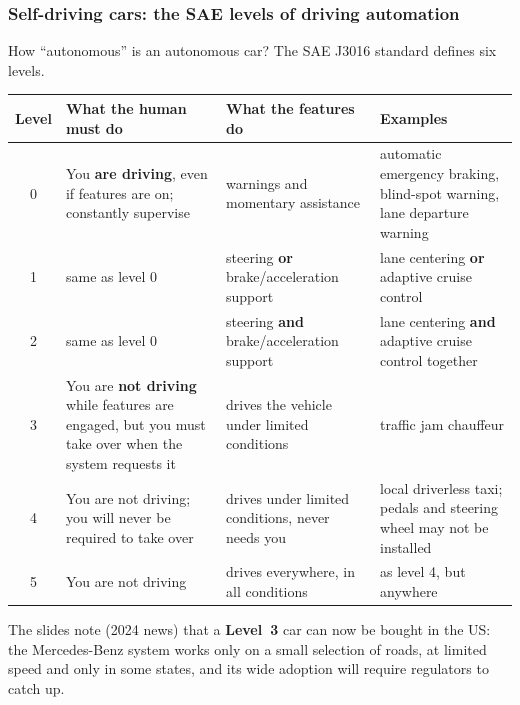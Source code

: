 \subsubsection{Self-driving cars: the SAE levels of driving automation}

How ``autonomous'' is an autonomous car? The SAE J3016 standard defines six levels.

\begin{center}
\small
\renewcommand{\arraystretch}{1.15}
\begin{tabularx}{\linewidth}{@{}c >{\raggedright\arraybackslash}X >{\raggedright\arraybackslash}X >{\raggedright\arraybackslash}X@{}}
\toprule
\textbf{Level} & \textbf{What the human must do} & \textbf{What the features do} & \textbf{Examples} \\
\midrule
\rowcolor{nbblue!6} 0 & You \textbf{are driving}, even if features are on; constantly supervise & warnings and momentary assistance & automatic emergency braking, blind-spot warning, lane departure warning \\
\rowcolor{nbblue!6} 1 & same as level 0 & steering \textbf{or} brake/acceleration support & lane centering \textbf{or} adaptive cruise control \\
\rowcolor{nbblue!6} 2 & same as level 0 & steering \textbf{and} brake/acceleration support & lane centering \textbf{and} adaptive cruise control together \\
\rowcolor{nbgreen!8} 3 & You are \textbf{not driving} while features are engaged, but you must take over when the system requests it & drives the vehicle under limited conditions & traffic jam chauffeur \\
\rowcolor{nbgreen!8} 4 & You are not driving; you will never be required to take over & drives under limited conditions, never needs you & local driverless taxi; pedals and steering wheel may not be installed \\
\rowcolor{nbgreen!8} 5 & You are not driving & drives everywhere, in all conditions & as level 4, but anywhere \\
\bottomrule
\end{tabularx}
\end{center}

The slides note (2024 news) that a \textbf{Level~3} car can now be bought in the US: the
Mercedes-Benz system works only on a small selection of roads, at limited speed and only in
some states, and its wide adoption will require regulators to catch up.


